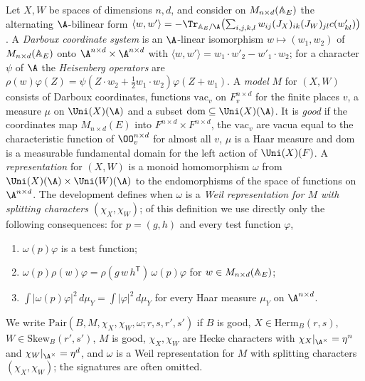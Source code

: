 \begin{definition}\label{pf:thmK-cone:def-model}
Let $X,W$ be spaces of dimensions $n,d$, and consider on $M_{n\times d}(\mathbb{A}_E)$ the alternating $\A$-bilinear form
$\langle w,w'\rangle=-\Tr_{\thmKconeAE/\A}\bigl(\sum_{i,j,k,l}w_{ij}(J_X)_{ik}(J_W)_{jl}c(w'_{kl})\bigr)$.  A \emph{Darboux
coordinate system} is an $\A$-linear isomorphism $w\mapsto(w_1,w_2)$ of $M_{n\times d}(\mathbb{A}_E)$ onto
$\A^{n\times d}\times\A^{n\times d}$ with $\langle w,w'\rangle=w_1\cdot w'_2-w'_1\cdot w_2$; for a character $\psi$ of $\A$ the
\emph{Heisenberg operators} are $\rho(w)\varphi(Z)=\psi(Z\cdot w_2+\tfrac12w_1\cdot w_2)\varphi(Z+w_1)$.  A \emph{model} $M$
for $(X,W)$ consists of Darboux coordinates, functions $\mathrm{vac}_v$ on $F_v^{n\times d}$ for the finite places $v$, a
measure $\mu$ on $\Uni(X)(\A)$ and a subset $\mathrm{dom}\subseteq\Uni(X)(\A)$.  It is \emph{good} if the coordinates map
$M_{n\times d}(E)$ into $F^{n\times d}\times F^{n\times d}$, the $\mathrm{vac}_v$ are vacua equal to the characteristic
function of $\OO_v^{n\times d}$ for almost all $v$, $\mu$ is a Haar measure and $\mathrm{dom}$ is a measurable fundamental
domain for the left action of $\Uni(X)(F)$.  A \emph{representation} for $(X,W)$ is a monoid homomorphism $\omega$ from
$\Uni(X)(\A)\times\Uni(W)(\A)$ to the endomorphisms of the space of functions on $\A^{n\times d}$.  The development defines
when $\omega$ is a \emph{Weil representation for $M$ with splitting characters $(\chi_X,\chi_W)$}; of this definition we
use directly only the following consequences: for $p=(g,h)$ and every test function $\varphi$,
\begin{enumerate}[label=\textup{(W\arabic*)},ref=\textup{(W\arabic*)}]
\item\label{pf:thmK-cone:W1} $\omega(p)\varphi$ is a test function;
\item\label{pf:thmK-cone:W2} $\omega(p)\rho(w)\varphi=\rho(g\,w\,h^{\mathsf T})\,\omega(p)\varphi$ for
  $w\in M_{n\times d}(\mathbb{A}_E)$;
\item\label{pf:thmK-cone:W3} $\int|\omega(p)\varphi|^2\,d\mu_Y=\int|\varphi|^2\,d\mu_Y$ for every Haar measure $\mu_Y$ on
  $\A^{n\times d}$.
\end{enumerate}
We write $\mathrm{Pair}(B,M,\chi_X,\chi_W,\omega;r,s,r',s')$ if $B$ is good, $X\in\mathrm{Herm}_B(r,s)$,
$W\in\mathrm{Skew}_B(r',s')$, $M$ is good, $\chi_X,\chi_W$ are Hecke characters with $\chi_X|_{\A^\times}=\eta^n$ and
$\chi_W|_{\A^\times}=\eta^d$, and $\omega$ is a Weil representation for $M$ with splitting characters $(\chi_X,\chi_W)$; the
signatures are often omitted.
\end{definition}

